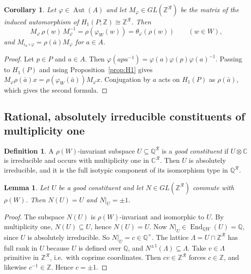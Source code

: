 \documentclass[11pt]{amsart}
\newtheorem{lemma}[theorem]{Lemma}
\newtheorem{corollary}[theorem]{Corollary}
\theoremstyle{definition}
\newtheorem{definition}[theorem]{Definition}
\newcommand{\Z}{\mathbb{Z}}
\newcommand{\Q}{\mathbb{Q}}
\newcommand{\C}{\mathbb{C}}
\newcommand{\R}{\mathcal{R}}
\newcommand{\Aut}{\operatorname{Aut}}
\newcommand{\End}{\operatorname{End}}
\begin{document}
\begin{corollary}\label{cor:twist}
Let $\varphi\in\Aut(A)$ and let $M_\varphi\in GL(\Z^\R)$ be the matrix of the induced automorphism of
$H_1(P;\Z)\cong\Z^\R$. Then
\begin{equation}\label{eq:twist}
M_\varphi\,\rho(w)\,M_\varphi^{-1}=\rho(\varphi_W(w))=\theta_\varphi(\rho(w))\qquad(w\in W),
\end{equation}
and $M_{\iota_a\circ\varphi}=\rho(\bar a)M_\varphi$ for $a\in A$.
\end{corollary}

\begin{proof}
Let $p\in P$ and $a\in A$. Then $\varphi(apa^{-1})=\varphi(a)\varphi(p)\varphi(a)^{-1}$. Passing to $H_1(P)$ and
using Proposition~\ref{prop:H1} gives $M_\varphi\rho(\bar a)x=\rho(\varphi_W(\bar a))M_\varphi x$. Conjugation by
$a$ acts on $H_1(P)$ as $\rho(\bar a)$, which gives the second formula.
\end{proof}

\subsection{Rational, absolutely irreducible constituents of multiplicity one}
\begin{definition}
A $\rho(W)$-invariant subspace $U\subseteq\Q^\R$ is a \emph{good constituent} if $U\otimes\C$ is irreducible
and occurs with multiplicity one in $\C^\R$. Then $U$ is absolutely irreducible, and it is the full isotypic
component of its isomorphism type in $\Q^\R$.
\end{definition}

\begin{lemma}\label{lem:schur}
Let $U$ be a good constituent and let $N\in GL(\Z^\R)$ commute with $\rho(W)$. Then $N(U)=U$ and $N|_U=\pm1$.
\end{lemma}
\begin{proof}
The subspace $N(U)$ is $\rho(W)$-invariant and isomorphic to $U$. By multiplicity one, $N(U)\subseteq U$, hence
$N(U)=U$. Now $N|_U\in\End_{\Q W}(U)=\Q$, since $U$ is absolutely irreducible. So $N|_U=c\in\Q^\times$. The lattice
$\Lambda=U\cap\Z^\R$ has full rank in $U$ because $U$ is defined over $\Q$, and $N^{\pm1}(\Lambda)\subseteq\Lambda$.
Take $v\in\Lambda$ primitive in $\Z^\R$, i.e.\ with coprime coordinates. Then $cv\in\Z^\R$ forces $c\in\Z$, and
likewise $c^{-1}\in\Z$. Hence $c=\pm1$.
\end{proof}
\end{document}
